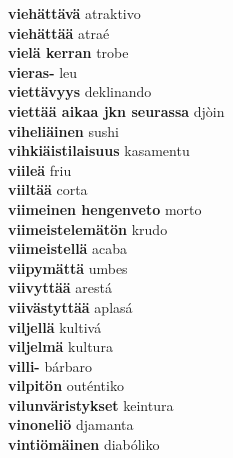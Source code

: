 \textbf{ viehättävä  } atraktivo \\
\textbf{ viehättää  } atraé \\
\textbf{ vielä kerran  } trobe \\
\textbf{ vieras-  } leu \\
\textbf{ viettävyys  } deklinando \\
\textbf{ viettää aikaa jkn seurassa  } djòin \\
\textbf{ viheliäinen  } sushi \\
\textbf{ vihkiäistilaisuus  } kasamentu \\
\textbf{ viileä  } friu \\
\textbf{ viiltää  } corta \\
\textbf{ viimeinen hengenveto  } morto \\
\textbf{ viimeistelemätön  } krudo \\
\textbf{ viimeistellä  } acaba \\
\textbf{ viipymättä  } umbes \\
\textbf{ viivyttää  } arestá \\
\textbf{ viivästyttää  } aplasá \\
\textbf{ viljellä  } kultivá \\
\textbf{ viljelmä  } kultura \\
\textbf{ villi-  } bárbaro \\
\textbf{ vilpitön  } outéntiko \\
\textbf{ vilunväristykset  } keintura \\
\textbf{ vinoneliö  } djamanta \\
\textbf{ vintiömäinen  } diabóliko \\
